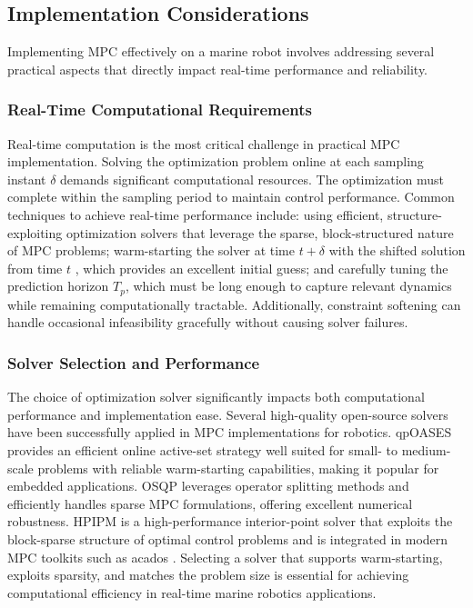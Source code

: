 \subsection{Implementation Considerations}

Implementing MPC effectively on a marine robot involves addressing several practical aspects that directly impact real-time performance and reliability.

\subsubsection{Real-Time Computational Requirements}

Real-time computation is the most critical challenge in practical MPC implementation. Solving the optimization problem online at each sampling instant $\delta$ demands significant computational resources. The optimization must complete within the sampling period to maintain control performance. Common techniques to achieve real-time performance include: using efficient, structure-exploiting optimization solvers that leverage the sparse, block-structured nature of MPC problems; warm-starting the solver at time $t+\delta$ with the shifted solution from time $t$ \cite{gros2020linear}, which provides an excellent initial guess; and carefully tuning the prediction horizon $T_p$, which must be long enough to capture relevant dynamics while remaining computationally tractable. Additionally, constraint softening can handle occasional infeasibility gracefully without causing solver failures.

\subsubsection{Solver Selection and Performance}

The choice of optimization solver significantly impacts both computational performance and implementation ease. Several high-quality open-source solvers have been successfully applied in MPC implementations for robotics. qpOASES \cite{qpoases} provides an efficient online active-set strategy well suited for small- to medium-scale problems with reliable warm-starting capabilities, making it popular for embedded applications. OSQP \cite{stellato2020osqp} leverages operator splitting methods and efficiently handles sparse MPC formulations, offering excellent numerical robustness. HPIPM \cite{frison2020hpipm} is a high-performance interior-point solver that exploits the block-sparse structure of optimal control problems and is integrated in modern MPC toolkits such as acados \cite{verschueren2022acados}. Selecting a solver that supports warm-starting, exploits sparsity, and matches the problem size is essential for achieving computational efficiency in real-time marine robotics applications.

